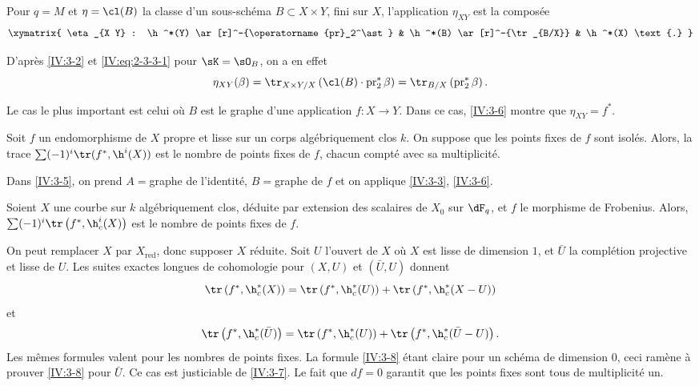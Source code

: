 \begin{proposition_}\label{IV:3-6}
Pour $q=M$ et $\eta=\cl(B)$ la classe d'un sous-schéma $B\subset X\times Y$, 
fini sur $X$, l'application $\eta_{X Y}$ est la composée 
\[\xymatrix{
  \eta_{X Y} : \h^*(Y) \ar[r]^-{\operatorname{pr}_2^\ast} 
    & \h^*(B) \ar[r]^-{\tr_{B/X}} 
    & \h^*(X) \text{.}
}\]
\end{proposition_}

D'après \ref{IV:3-2} et \eqref{IV:eq:2-3-3-1} pour $\sK=\sO_B$, on a en 
effet 
\[
  \eta_{X Y}(\beta) = \tr_{X\times Y/X}\left(\cl(B)\cdot \operatorname{pr}_2^\ast\beta\right) = \tr_{B/X}\left(\operatorname{pr}_2^\ast \beta\right) \text{.}
\]

Le cas le plus important est celui où $B$ est le graphe d'une application 
$f:X\to Y$. Dans ce cas, \ref{IV:3-6} montre que $\eta_{X Y}=f^\ast$. 





\begin{corollary_}\label{IV:3-7}
Soit $f$ un endomorphisme de $X$ propre et lisse sur un corps algébriquement 
clos $k$. On suppose que les points fixes de $f$ sont isolés. Alors, la 
trace $\sum (-1)^i \tr(f^\ast,\h^i(X))$ est le nombre de points fixes de $f$, 
chacun compté avec sa multiplicité.
\end{corollary_}

Dans \ref{IV:3-5}, on prend $A=$graphe de l'identité, $B=$graphe de $f$ et on 
applique \ref{IV:3-3}, \ref{IV:3-6}. 





\begin{corollary_}\label{IV:3-8}
Soient $X$ une courbe sur $k$ algébriquement clos, déduite par extension des 
scalaires de $X_0$ sur $\dF_q$, et $f$ le morphisme de Frobenius. Alors, 
$\sum (-1)^i \tr\left(f^\ast,\h_c^i(X)\right)$ est le nombre de points 
fixes de $f$.
\end{corollary_}

On peut remplacer $X$ par $X_\text{red}$, donc supposer $X$ réduite. Soit $U$ 
l'ouvert de $X$ où $X$ est lisse de dimension $1$, et $\bar U$ la 
complétion projective et lisse de $U$. Les suites exactes longues de 
cohomologie pour $(X,U)$ et $(\bar U,U)$ donnent 
\[
  \tr\left(f^\ast,\h_c^*(X)\right) = \tr\left(f^\ast,\h_c^*(U)\right) + \tr\left(f^\ast,\h_c^*(X-U)\right) 
\]
et
\[
  \tr\left(f^\ast,\h_c^*(\bar U)\right) = \tr\left(f^\ast,\h_c^*(U)\right) + \tr\left(f^\ast,\h_c^*(\bar U-U)\right) \text{.}
\]
Les mêmes formules valent pour les nombres de points fixes. La formule 
\ref{IV:3-8} étant claire pour un schéma de dimension $0$, ceci ramène 
à prouver \ref{IV:3-8} pour $\bar U$. Ce cas est justiciable de \ref{IV:3-7}. 
Le fait que $d f=0$ garantit que les points fixes sont tous de 
multiplicité un. 





